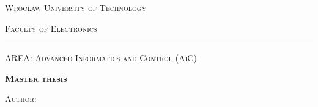 \titlepage
\addtolength{\textheight}{1.8cm}
\addtolength{\textwidth}{0.2cm}
\addtolength{\topmargin}{-2.2cm}
\enlargethispage{3cm}
\begin{center}
	\begin{Huge}
		\textsc{Wroclaw University of Technology}
	\end{Huge}

	\begin{huge}
		\vspace{1ex}
		\textsc{Faculty of Electronics}
	\end{huge}
	\rule[-0.3ex]{\textwidth}{1pt}
	
	\begin{flushleft}
		\begin{large}
			\vspace{0.4cm}
			\textsc{AREA: Advanced Informatics and Control (AiC)} \newline
		\end{large}
	\end{flushleft}

	\begin{center}
		\begin{Huge}
			\vspace{1.7ex}
			\textsc{\textbf{Master thesis}} 

		\end{Huge}
	\end{center}
	\vspace{1cm}
		
	\begin{flushright}
		\begin{minipage}[t][4cm][t]{11cm}
			\begin{center}
				\begin{large}
					\temat
				\end{large}
			\end{center}
			\vspace{0.3cm}
			\begin{center}
				\begin{large}
					\tematen
				\end{large}
			\end{center}
		\end{minipage}
	\end{flushright}
				
	\begin{flushright}
		\begin{minipage}[t]{10cm}
			\begin{flushleft}
				\begin{large}
					\vspace{0.3cm}
					\begin{large}
						\textsc{Author:}\newline
						\autor\newline
					\end{large}
					

\end{large}
\end{flushleft}
\end{minipage}
\end{flushright}
\end{center}
